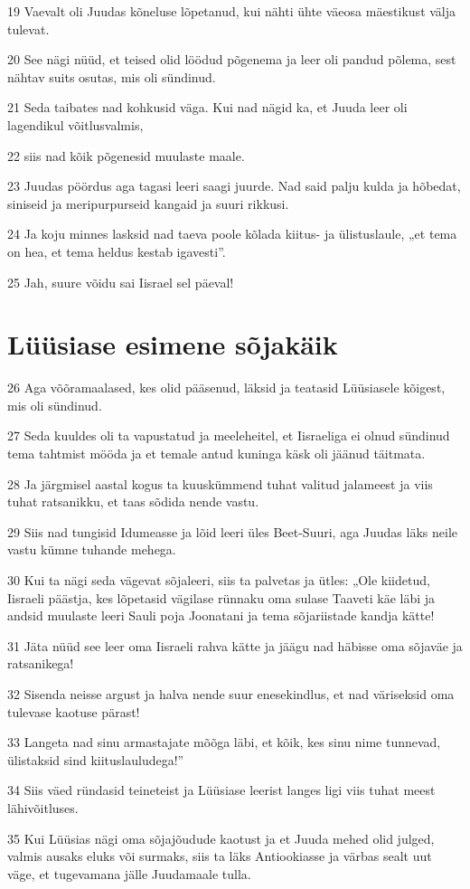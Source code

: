 \par 19 Vaevalt oli Juudas kõneluse lõpetanud, kui nähti ühte väeosa mäestikust välja tulevat.
\par 20 See nägi nüüd, et teised olid löödud põgenema ja leer oli pandud põlema, sest nähtav suits osutas, mis oli sündinud.
\par 21 Seda taibates nad kohkusid väga. Kui nad nägid ka, et Juuda leer oli lagendikul võitlusvalmis,
\par 22 siis nad kõik põgenesid muulaste maale.
\par 23 Juudas pöördus aga tagasi leeri saagi juurde. Nad said palju kulda ja hõbedat, siniseid ja meripurpurseid kangaid ja suuri rikkusi.
\par 24 Ja koju minnes lasksid nad taeva poole kõlada kiitus- ja ülistuslaule, „et tema on hea, et tema heldus kestab igavesti”.
\par 25 Jah, suure võidu sai Iisrael sel päeval! 

\section*{Lüüsiase esimene sõjakäik}

\par 26 Aga võõramaalased, kes olid pääsenud, läksid ja teatasid Lüüsiasele kõigest, mis oli sündinud.
\par 27 Seda kuuldes oli ta vapustatud ja meeleheitel, et Iisraeliga ei olnud sündinud tema tahtmist mööda ja et temale antud kuninga käsk oli jäänud täitmata.
\par 28 Ja järgmisel aastal kogus ta kuuskümmend tuhat valitud jalameest ja viis tuhat ratsanikku, et taas sõdida nende vastu.
\par 29 Siis nad tungisid Idumeasse ja lõid leeri üles Beet-Suuri, aga Juudas läks neile vastu kümne tuhande mehega.
\par 30 Kui ta nägi seda vägevat sõjaleeri, siis ta palvetas ja ütles: „Ole kiidetud, Iisraeli päästja, kes lõpetasid vägilase rünnaku oma sulase Taaveti käe läbi ja andsid muulaste leeri Sauli poja Joonatani ja tema sõjariistade kandja kätte!
\par 31 Jäta nüüd see leer oma Iisraeli rahva kätte ja jäägu nad häbisse oma sõjaväe ja ratsanikega!
\par 32 Sisenda neisse argust ja halva nende suur enesekindlus, et nad väriseksid oma tulevase kaotuse pärast!
\par 33 Langeta nad sinu armastajate mõõga läbi, et kõik, kes sinu nime tunnevad, ülistaksid sind kiituslauludega!”
\par 34 Siis väed ründasid teineteist ja Lüüsiase leerist langes ligi viis tuhat meest lähivõitluses.
\par 35 Kui Lüüsias nägi oma sõjajõudude kaotust ja et Juuda mehed olid julged, valmis ausaks eluks või surmaks, siis ta läks Antiookiasse ja värbas sealt uut väge, et tugevamana jälle Juudamaale tulla. 

